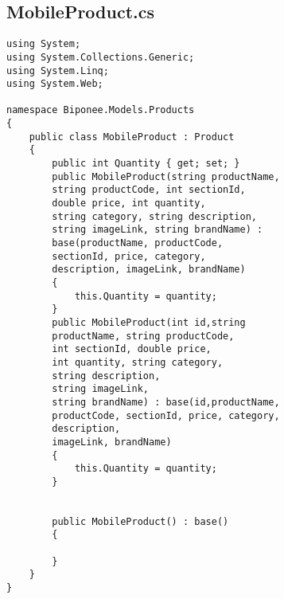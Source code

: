 \subsection{MobileProduct.cs}
\begin{lstlisting}
using System;
using System.Collections.Generic;
using System.Linq;
using System.Web;

namespace Biponee.Models.Products
{
    public class MobileProduct : Product
    {
        public int Quantity { get; set; }
        public MobileProduct(string productName, 
        string productCode, int sectionId, 
        double price, int quantity,
        string category, string description, 
        string imageLink, string brandName) : 
        base(productName, productCode, 
        sectionId, price, category, 
        description, imageLink, brandName)
        {
            this.Quantity = quantity;
        }
        public MobileProduct(int id,string 
        productName, string productCode, 
        int sectionId, double price, 
        int quantity, string category, 
        string description, 
        string imageLink, 
        string brandName) : base(id,productName, 
        productCode, sectionId, price, category, 
        description, 
        imageLink, brandName)
        {
            this.Quantity = quantity;
        }


        public MobileProduct() : base()
        {

        }
    }
}

\end{lstlisting}

\newpage

